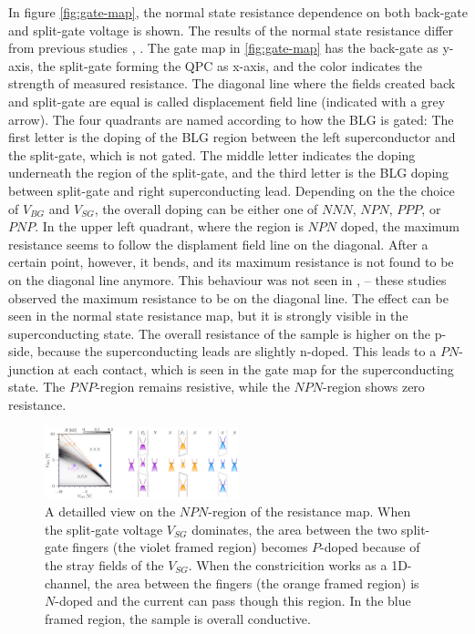 In figure \ref{fig:gate-map}, the normal state resistance dependence on both back-gate and split-gate voltage is shown. The results of the normal state resistance differ from previous studies \cite{Oostinga2008}, \cite{Taychatanapat2010}. The gate map in \ref{fig:gate-map} has the back-gate as y-axis, the split-gate forming the QPC as x-axis, and the color indicates the strength of measured resistance. The diagonal line where the fields created back and split-gate are equal is called displacement field line (indicated with a grey arrow). The four quadrants are named according to how the BLG is gated: The first letter is the doping of the BLG region between the left superconductor and the split-gate, which is not gated. The middle letter indicates the doping underneath the region of the split-gate, and the third letter is the BLG doping between split-gate and right superconducting lead. Depending on the the choice of $V_{BG}$ and $V_{SG}$, the overall doping can be either one of $NNN$, $NPN$, $PPP$, or $PNP$. In the upper left quadrant, where the region is $NPN$ doped, the maximum resistance seems to follow the displament field line on the diagonal. After a certain point, however, it bends, and its maximum resistance is not found to be on the diagonal line anymore. This behaviour was not seen in  \cite{Oostinga2008}, \cite{Taychatanapat2010} -- these studies observed the maximum resistance to be on the diagonal line. The effect can be seen in the normal state resistance map, but it is strongly visible in the superconducting state. The overall resistance of the sample is higher on the p-side, because the superconducting leads are slightly n-doped. This leads to a $PN$-junction at each contact, which is seen in the gate map for the superconducting state. The $PNP$-region remains resistive, while the $NPN$-region shows zero resistance.
\begin{figure}
\centering
\includegraphics[width=0.5\textwidth]{figure/experiment/npn-region-detail}
\caption{A detailled view on the $NPN$-region of the resistance map. When the split-gate voltage $V_{SG}$ dominates, the area between the two split-gate fingers (the violet framed region) becomes $P$-doped because of the stray fields of the $V_{SG}$. When the constricition works as a 1D-channel, the area between the fingers (the orange framed region) is $N$-doped and the current can pass though this region. In the blue framed region, the sample is overall conductive. }\label{fig:npn-regions-gates}
\end{figure}
